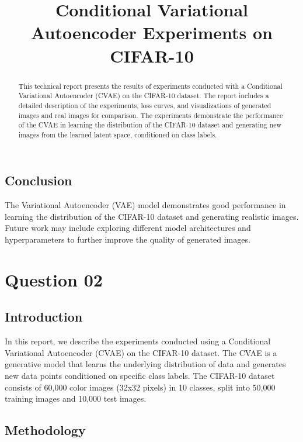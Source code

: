 \documentclass{article}
\begin{document}
\subsection{Conclusion}
The Variational Autoencoder (VAE) model demonstrates good performance in learning the distribution of the CIFAR-10 dataset and generating realistic images. Future work may include exploring different model architectures and hyperparameters to further improve the quality of generated images.









\section{Question 02}

\title{Conditional Variational Autoencoder Experiments on CIFAR-10}

\maketitle

\begin{abstract}
This technical report presents the results of experiments conducted with a Conditional Variational Autoencoder (CVAE) on the CIFAR-10 dataset. The report includes a detailed description of the experiments, loss curves, and visualizations of generated images and real images for comparison. The experiments demonstrate the performance of the CVAE in learning the distribution of the CIFAR-10 dataset and generating new images from the learned latent space, conditioned on class labels.
\end{abstract}

\subsection{Introduction}
In this report, we describe the experiments conducted using a Conditional Variational Autoencoder (CVAE) on the CIFAR-10 dataset. The CVAE is a generative model that learns the underlying distribution of data and generates new data points conditioned on specific class labels. The CIFAR-10 dataset consists of 60,000 color images (32x32 pixels) in 10 classes, split into 50,000 training images and 10,000 test images.

\subsection{Methodology}
\end{document}
